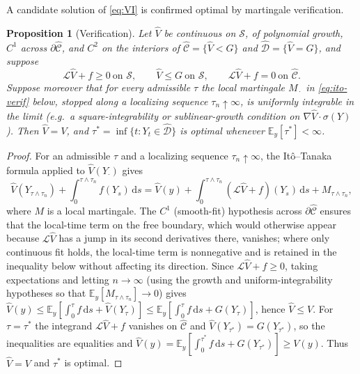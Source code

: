 \documentclass[pdflatex,sn-mathphys-num]{sn-jnl}
\theoremstyle{plain}
\newtheorem{proposition}[theorem]{Proposition}
\theoremstyle{definition}
\newcommand{\E}{\mathbb{E}}
\newcommand{\Lgen}{\mathscr{L}}
\newcommand{\dd}{\,\mathrm{d}}
\begin{document}
A candidate solution of \eqref{eq:VI} is confirmed optimal by martingale
verification.

\begin{proposition}[Verification]\label{prop:verif}
Let $\widehat V$ be continuous on $\mathcal S$, of polynomial growth, $C^1$ across
$\partial\widehat{\mathcal C}$, and $C^2$ on the interiors of
$\widehat{\mathcal C}=\{\widehat V<G\}$ and $\widehat{\mathcal D}=\{\widehat V=G\}$,
and suppose
\[
  \Lgen\widehat V+f\ge0\ \text{on }\mathcal S,\qquad
  \widehat V\le G\ \text{on }\mathcal S,\qquad
  \Lgen\widehat V+f=0\ \text{on }\widehat{\mathcal C}.
\]
Suppose moreover that for every admissible $\tau$ the local martingale
$M_{\,\cdot\,}$ in \eqref{eq:ito-verif} below, stopped along a localizing sequence
$\tau_n\uparrow\infty$, is uniformly integrable in the limit (e.g.\ a
square-integrability or sublinear-growth condition on
$\nabla\widehat V\cdot\sigma(Y)$). Then $\widehat V=V$, and
$\tau^\ast=\inf\{t:Y_t\in\widehat{\mathcal D}\}$ is optimal whenever
$\E_y[\tau^\ast]<\infty$.
\end{proposition}

\begin{proof}
For an admissible $\tau$ and a localizing sequence $\tau_n\uparrow\infty$, the
It\^o--Tanaka formula applied to $\widehat V(Y_{\cdot})$ gives
\begin{equation}\label{eq:ito-verif}
  \widehat V(Y_{\tau\wedge\tau_n})+\int_0^{\tau\wedge\tau_n} f(Y_s)\dd s
   =\widehat V(y)+\int_0^{\tau\wedge\tau_n}(\Lgen\widehat V+f)(Y_s)\dd s
   +M_{\tau\wedge\tau_n},
\end{equation}
where $M$ is a local martingale. The $C^1$ (smooth-fit) hypothesis across
$\partial\widehat{\mathcal C}$ ensures that the local-time term on the free
boundary, which would otherwise appear because $\Lgen\widehat V$ has a jump in its
second derivatives there, vanishes; where only continuous fit holds, the
local-time term is nonnegative and is retained in the inequality below without
affecting its direction. Since $\Lgen\widehat V+f\ge0$, taking expectations and
letting $n\to\infty$ (using the growth and uniform-integrability hypotheses so
that $\E_y[M_{\tau\wedge\tau_n}]\to0$) gives
$\widehat V(y)\le\E_y[\int_0^\tau f\dd s+\widehat V(Y_\tau)]
\le\E_y[\int_0^\tau f\dd s+G(Y_\tau)]$, hence $\widehat V\le V$. For
$\tau=\tau^\ast$ the integrand $\Lgen\widehat V+f$ vanishes on
$\widehat{\mathcal C}$ and $\widehat V(Y_{\tau^\ast})=G(Y_{\tau^\ast})$, so the
inequalities are equalities and $\widehat V(y)=\E_y[\int_0^{\tau^\ast}f\dd
s+G(Y_{\tau^\ast})]\ge V(y)$. Thus $\widehat V=V$ and $\tau^\ast$ is optimal.
\end{proof}
\end{document}
